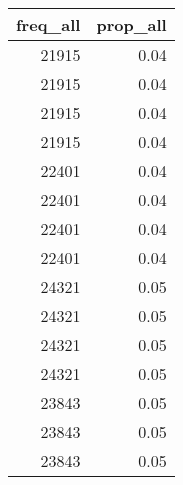 \begin{tabular}{rr}
  \toprule
 freq\_all & prop\_all \\ 
  \midrule
  21915 & 0.04 \\ 
  21915 & 0.04 \\ 
  21915 & 0.04 \\ 
  21915 & 0.04 \\ 
  22401 & 0.04 \\ 
  22401 & 0.04 \\ 
  22401 & 0.04 \\ 
  22401 & 0.04 \\ 
  24321 & 0.05 \\ 
  24321 & 0.05 \\ 
  24321 & 0.05 \\ 
  24321 & 0.05 \\ 
  23843 & 0.05 \\ 
  23843 & 0.05 \\ 
  23843 & 0.05 \\ 
   \bottomrule
\end{tabular}
